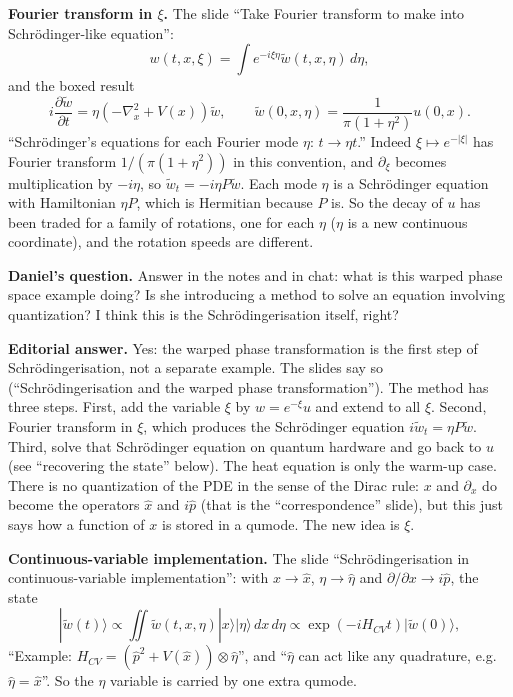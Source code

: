 \medskip\noindent
{\bf Fourier transform in $\xi$.}
The slide ``Take Fourier transform to make
into Schr\"odinger-like equation'':
$$
w(t,x,\xi)=\int e^{-i\xi\eta}
\tilde w(t,x,\eta)\,d\eta,
$$
and the boxed result
$$
i\frac{\partial\tilde w}{\partial t}
=\eta(-\nabla_x^2+V(x))\tilde w,
\qquad
\tilde w(0,x,\eta)=\frac{1}{\pi(1+\eta^2)}
u(0,x).
$$
``Schr\"odinger's equations for each Fourier
mode $\eta$: $t\to\eta t$.'' Indeed
$\xi\mapsto e^{-|\xi|}$ has Fourier
transform $1/(\pi(1+\eta^2))$ in this
convention, and $\partial_\xi$ becomes
multiplication by $-i\eta$, so
$\tilde w_t=-i\eta P\tilde w$. Each mode
$\eta$ is a Schr\"odinger equation with
Hamiltonian $\eta P$, which is Hermitian
because $P$ is. So the decay of $u$ has been
traded for a family of rotations, one for
each $\eta$ ($\eta$ is a new continuous
coordinate), and the rotation speeds are
different.

\medskip\noindent
{\bf Daniel's question.}
Answer in the notes and in chat: what is this
warped phase space example doing? Is she
introducing a method to solve an equation
involving quantization? I think this is the
Schr\"odingerisation itself, right?

\medskip\noindent
{\bf Editorial answer.}
Yes: the warped phase transformation is the
first step of Schr\"odingerisation, not a
separate example. The slides say so
(``Schr\"odingerisation and the warped phase
transformation''). The method has three
steps. First, add the variable $\xi$ by
$w=e^{-\xi}u$ and extend to all $\xi$. Second,
Fourier transform in $\xi$, which produces
the Schr\"odinger equation
$i\tilde w_t=\eta P\tilde w$. Third, solve that
Schr\"odinger equation on quantum hardware and
go back to $u$ (see ``recovering the state''
below). The heat equation is only the
warm-up case. There is no quantization of the
PDE in the sense of the Dirac rule: $x$ and
$\partial_x$ do become the operators $\hat x$
and $i\hat p$ (that is the
``correspondence'' slide), but this just says
how a function of $x$ is stored in a qumode.
The new idea is $\xi$.

\medskip\noindent
{\bf Continuous-variable implementation.}
The slide ``Schr\"odingerisation in
continuous-variable implementation'': with
$x\to\hat x$, $\eta\to\hat\eta$ and
$\partial/\partial x\to i\hat p$, the state
$$
|\tilde w(t)\rangle\propto\iint
\tilde w(t,x,\eta)|x\rangle|\eta\rangle
\,dx\,d\eta\propto
\exp(-iH_{CV}t)|\tilde w(0)\rangle,
$$
``Example: $H_{CV}=(\hat p^2+V(\hat x))
\otimes\hat\eta$'', and ``$\hat\eta$ can act
like any quadrature, e.g. $\hat\eta=\hat x$''.
So the $\eta$ variable is carried by one extra
qumode.

